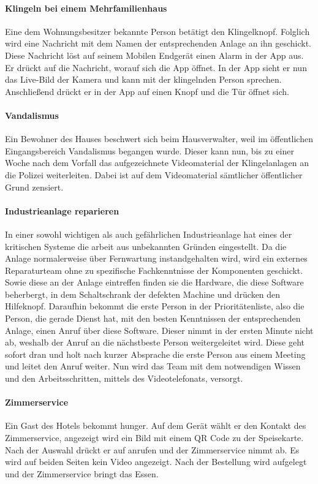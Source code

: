 \paragraph{Klingeln bei einem Mehrfamilienhaus}
    Eine dem Wohnungsbesitzer bekannte Person betätigt den Klingelknopf.
    Folglich wird eine Nachricht mit dem Namen der entsprechenden Anlage an ihn geschickt.
    Diese Nachricht löst auf seinem Mobilen Endgerät einen Alarm in der App aus.
    Er drückt auf die Nachricht, worauf sich die App öffnet.
    In der App sieht er nun das Live-Bild der Kamera und kann mit der klingelnden Person sprechen.
    Anschließend drückt er in der App auf einen Knopf und die Tür öffnet sich.

\paragraph{Vandalismus}
    Ein Bewohner des Hauses beschwert sich beim Hausverwalter, weil im öffentlichen Eingangsbereich Vandalismus begangen wurde.
    Dieser kann nun, bis zu einer Woche nach dem Vorfall das aufgezeichnete Videomaterial der Klingelanlagen an die Polizei weiterleiten.
    Dabei ist auf dem Videomaterial sämtlicher öffentlicher Grund zensiert.

\paragraph{Industrieanlage reparieren}
    In einer sowohl wichtigen als auch gefährlichen Industrieanlage hat eines der kritischen Systeme die arbeit aus unbekannten Gründen eingestellt.
    Da die Anlage normalerweise über Fernwartung instandgehalten wird, wird ein externes Reparaturteam ohne zu spezifische Fachkenntnisse der Komponenten geschickt.
    Sowie diese an der Anlage eintreffen finden sie die Hardware, die diese Software beherbergt, in dem Schaltschrank der defekten Machine und drücken den Hilfeknopf.
    Daraufhin bekommt die erste Person in der Prioritätenliste, also die Person, die gerade Dienst hat, mit den besten Kenntnissen der entsprechenden Anlage, einen Anruf über diese Software.
    Dieser nimmt in der ersten Minute nicht ab, weshalb der Anruf an die nächstbeste Person weitergeleitet wird.
    Diese geht sofort dran und holt nach kurzer Absprache die erste Person aus einem Meeting und leitet den Anruf weiter.
    Nun wird das Team mit dem notwendigen Wissen und den Arbeitsschritten, mittels des Videotelefonats, versorgt.

\paragraph{Zimmerservice}
    Ein Gast des Hotels bekommt hunger.
    Auf dem Gerät wählt er den Kontakt des Zimmerservice, angezeigt wird ein Bild mit einem QR Code zu der Speisekarte.
    Nach der Auswahl drückt er auf anrufen und der Zimmerservice nimmt ab.
    Es wird auf beiden Seiten kein Video angezeigt.
    Nach der Bestellung wird aufgelegt und der Zimmerservice bringt das Essen.
